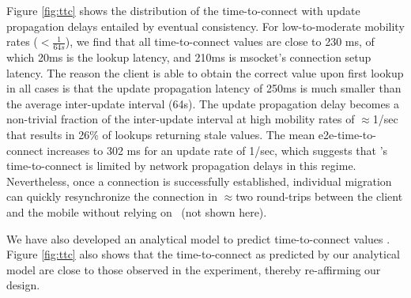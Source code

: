Figure \ref{fig:ttc} shows the distribution of the time-to-connect with update propagation delays entailed by eventual consistency. For low-to-moderate mobility rates ($<\frac{1}{64s}$), we find that all time-to-connect values are close to 230 ms, of which 20ms is the lookup latency, and 210ms is msocket's connection setup latency. The reason the client is able to obtain the correct value upon first lookup in all cases is that the update propagation latency of 250ms is much smaller than the average inter-update interval (64s).  The update propagation delay becomes a non-trivial fraction of the inter-update interval at high mobility rates of $\approx$1/sec that results in  26\% of lookups returning stale values. The mean e2e-time-to-connect increases to  302 ms for an update rate of 1/sec, which suggests that \auspice's time-to-connect is limited by network propagation delays in this regime. Nevertheless, once a connection is successfully established, {individual} migration can quickly resynchronize the connection in $\approx$two round-trips between the client and the mobile without relying on \auspice\ (not shown here). 

We have also developed an analytical model to predict time-to-connect values \cite{techreport}. Figure \ref{fig:ttc} also shows that the time-to-connect as predicted by our analytical model are close to those observed in the experiment, thereby re-affirming our design. 


